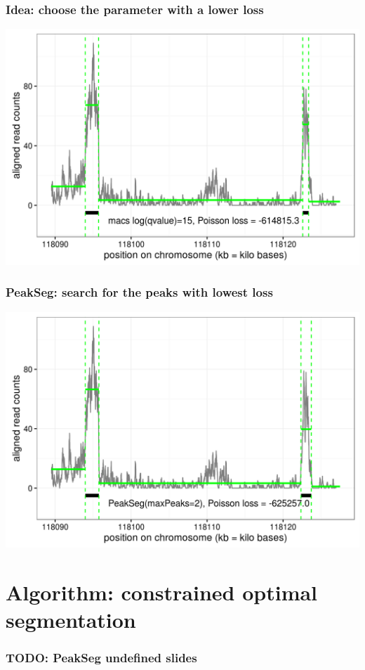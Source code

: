 \documentclass{beamer}
\begin{document}
\begin{frame}
  \frametitle{Idea: choose the parameter with a lower loss}
  \includegraphics[width=1\textwidth]{figure-macs-problem-15.png}
\end{frame}

\begin{frame}
  \frametitle{PeakSeg: search for the peaks with lowest loss}
  \includegraphics[width=1\textwidth]{figure-macs-problem-PeakSeg.png}
\end{frame}

\section{Algorithm: constrained optimal segmentation}

\begin{frame}
  \frametitle{TODO: PeakSeg undefined slides}
\end{frame}
\end{document}
